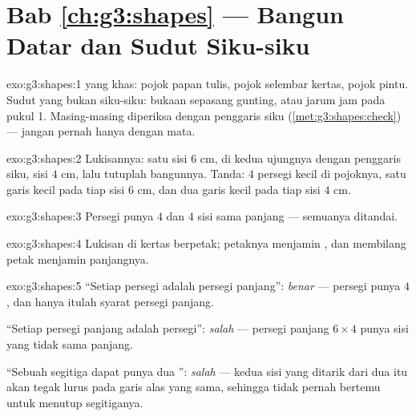 \section*{Bab \ref{ch:g3:shapes} --- Bangun Datar dan Sudut Siku-siku}

\begin{solution}{exo:g3:shapes:1}
 yang khas: pojok papan tulis, pojok selembar kertas,
pojok pintu. Sudut yang bukan siku-siku: bukaan sepasang gunting,
atau jarum jam pada pukul 1. Masing-masing diperiksa dengan
penggaris siku (\cref{met:g3:shapes:check}) --- jangan pernah hanya dengan mata.
\end{solution}

\begin{solution}{exo:g3:shapes:2}
Lukisannya: satu sisi $6$ cm,  di kedua ujungnya
dengan penggaris siku, sisi $4$ cm, lalu tutuplah bangunnya. Tanda:
$4$ persegi kecil di pojoknya, satu garis kecil pada tiap sisi $6$
cm, dan dua garis kecil pada tiap sisi $4$ cm.
\end{solution}

\begin{solution}{exo:g3:shapes:3}
Persegi punya $4$  dan $4$ sisi sama panjang --- semuanya ditandai.
\end{solution}

\begin{solution}{exo:g3:shapes:4}
Lukisan di kertas berpetak; petaknya menjamin , dan
membilang petak menjamin panjangnya.
\end{solution}

\begin{solution}{exo:g3:shapes:5}
``Setiap persegi adalah persegi panjang'': \emph{benar} --- persegi
punya $4$ , dan hanya itulah syarat persegi panjang.

``Setiap persegi panjang adalah persegi'': \emph{salah} --- persegi
panjang $6 \times 4$ punya sisi yang tidak sama panjang.

``Sebuah segitiga dapat punya dua '': \emph{salah}
--- kedua sisi yang ditarik dari dua  itu akan tegak
lurus pada garis alas yang sama, sehingga tidak pernah bertemu untuk menutup segitiganya.
\end{solution}

